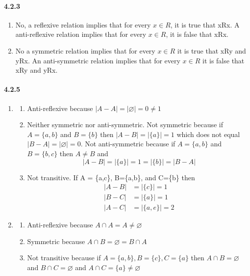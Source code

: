 \documentclass[11pt, letterpaper, twocolumn, fleqn]{article}
\let\emptyset\varnothing
\begin{document}
    \paragraph{4.2.3}
        \begin{enumerate}
            \item No, a reflexive relation implies that for every $x \in R$, it is true that xRx. A anti-reflexive relation implies that for every $x \in R$, it is false that xRx.
            \item No a symmetric relation implies that for every $x \in R$ it is true that xRy and yRx. An anti-symmetric relation implies that for every $x \in R$ it is false that xRy and yRx.
        \end{enumerate}
    
    \paragraph{4.2.5}
        \begin{enumerate}
            \item 
                \begin{enumerate}
                    \item Anti-reflexive because $|A-A| = |\emptyset| = 0 \neq 1$ \newline
                    \item Neither symmetric nor anti-symmetric. Not symmetric because if $A=\{a,b\}$ and $B=\{b\}$ then $|A-B| = |\{a\}| = 1$ which does not equal $|B-A| = |\emptyset| = 0$. Not anti-symmetric because if $A=\{a,b\}$ and $B=\{b,c\}$ then $A \neq B$ and 
                        $$|A-B| = |\{a\}| = 1 = |\{b\}| = |B-A|$$
                    \item Not transitive. If A = \{a,c\}, B=\{a,b\}, and C=\{b\} then 
                    \begin{align*}
                        |A-B| &= |\{c\}| = 1 \\
                        |B-C| &= |\{a\}| = 1 \\
                        |A-C| &= |\{a,e\}| = 2
                    \end{align*}
                \end{enumerate}
            \item
                \begin{enumerate}
                    \item Anti-reflexive because $A \cap A = A \neq \emptyset$
                    \item Symmetric because $A \cap B = \emptyset = B \cap A$
                    \item Not transitive because if $A = \{a,b\}, B=\{c\}, C=\{a\}$ then $A \cap B = \emptyset$ and $B \cap C = \emptyset$ and $A \cap C = \{a\} \neq \emptyset$
                \end{enumerate}
        \end{enumerate}
    
\end{document}
